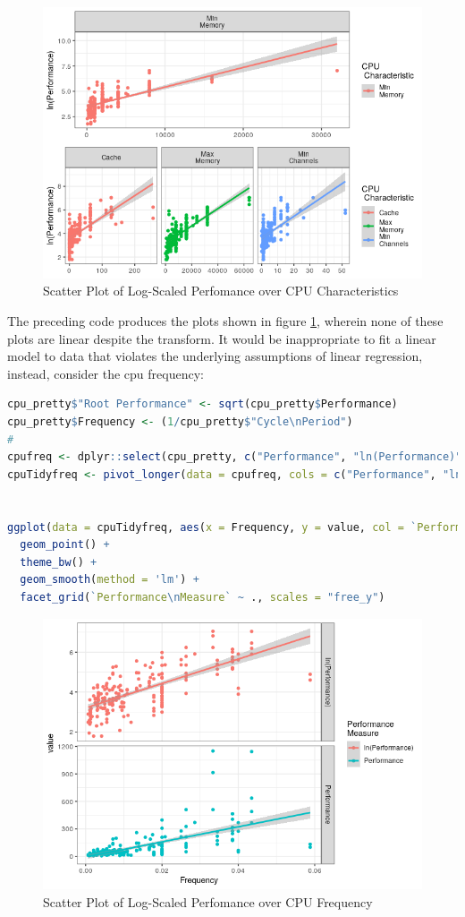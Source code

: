 \documentclass[
]{article}
\begin{document}
\begin{figure}[h!]
\centering
\includegraphics[width=0.7\linewidth]{SecAssignment_files/figure-html/splog-1.png}
\caption{Scatter Plot of Log-Scaled Perfomance over CPU Characteristics}
\label{splog-1}
\end{figure}

\newpage

The preceding code produces the plots shown in figure \ref{splog-1}, wherein none of these plots are linear despite the transform. It would be
inappropriate to fit a linear model to data that violates the underlying
assumptions of linear regression, instead, consider the cpu frequency:

\begin{lstlisting}[language=R]
cpu_pretty$"Root Performance" <- sqrt(cpu_pretty$Performance)
cpu_pretty$Frequency <- (1/cpu_pretty$"Cycle\nPeriod")
#
cpufreq <- dplyr::select(cpu_pretty, c("Performance", "ln(Performance)", "Frequency"))
cpuTidyfreq <- pivot_longer(data = cpufreq, cols = c("Performance", "ln(Performance)"), names_to = "Performance\nMeasure")


ggplot(data = cpuTidyfreq, aes(x = Frequency, y = value, col = `Performance\nMeasure`)) +
  geom_point() +
  theme_bw() +
  geom_smooth(method = 'lm') +
  facet_grid(`Performance\nMeasure` ~ ., scales = "free_y")
\end{lstlisting}

\begin{figure}[htbp]
	\centering
	\includegraphics[width=0.7\linewidth]{SecAssignment_files/figure-html/unnamed-chunk-2-1.png}
	\caption{Scatter Plot of Log-Scaled Perfomance over CPU Frequency}
	\label{unnamed21}
\end{figure}
\end{document}
